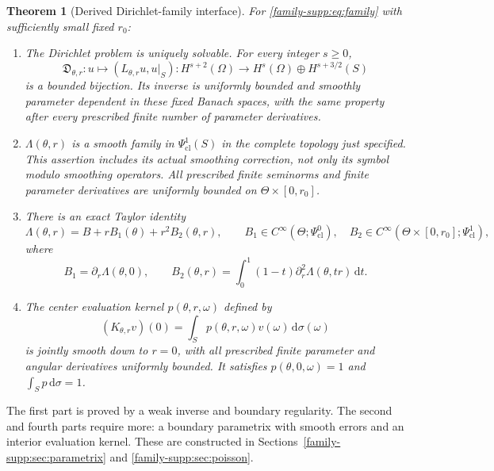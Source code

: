 \documentclass[11pt]{article}
\newtheorem{theorem}{Theorem}[section]
\theoremstyle{definition}
\theoremstyle{remark}
\newcommand{\dd}{\mathrm d}
\numberwithin{equation}{section}
\providecommand{\Ps}{\Psi_{\mathrm{cl}}}
\providecommand{\tht}{\theta}
\begin{document}
\begin{theorem}[Derived Dirichlet-family interface]\label{family-supp:thm:family}
For \eqref{family-supp:eq:family} with sufficiently small fixed $r_0$:
\begin{enumerate}
\item The Dirichlet problem is uniquely solvable. For every integer $s\geq0$,
\begin{equation}\label{family-supp:eq:inverse-space}
 \mathfrak D_{\tht,r}:u\longmapsto(L_{\tht,r}u,u|_S):
 H^{s+2}(\Omega)\longrightarrow H^s(\Omega)\oplus H^{s+3/2}(S)
\end{equation}
is a bounded bijection. Its inverse is uniformly bounded and smoothly
parameter dependent in these fixed Banach spaces, with the same property
after every prescribed finite number of parameter derivatives.
\item $\Lambda(\tht,r)$ is a smooth family in $\Ps^1(S)$ in the complete
topology just specified. This assertion includes its actual smoothing
correction, not only its symbol modulo smoothing operators. All prescribed
finite seminorms and finite parameter derivatives are uniformly bounded
on $\Theta\times[0,r_0]$.
\item There is an exact Taylor identity
\begin{equation}\label{family-supp:eq:Taylor}
 \Lambda(\tht,r)=B+r B_1(\tht)+r^2 B_2(\tht,r),
 \qquad B_1\in C^\infty(\Theta;\Ps^0),\quad
 B_2\in C^\infty(\Theta\times[0,r_0];\Ps^1),
\end{equation}
where
\begin{equation}\label{family-supp:eq:B2}
 B_1=\partial_r\Lambda(\tht,0),\qquad
 B_2(\tht,r)=\int_0^1(1-t)\partial_r^2\Lambda(\tht,tr)\,\dd t.
\end{equation}
\item The center evaluation kernel $p(\tht,r,\omega)$ defined by
\begin{equation}\label{family-supp:eq:pdef}
 (K_{\tht,r}v)(0)=\int_S p(\tht,r,\omega)v(\omega)\,\dd\sigma(\omega)
\end{equation}
is jointly smooth down to $r=0$, with all prescribed finite parameter and
angular derivatives uniformly bounded. It satisfies $p(\tht,0,\omega)=1$
and $\int_Sp\,\dd\sigma=1$.
\end{enumerate}
\end{theorem}

The first part is proved by a weak inverse and boundary regularity. The
second and fourth parts require more: a boundary parametrix with smooth
errors and an interior evaluation kernel. These are constructed in
Sections~\ref{family-supp:sec:parametrix} and \ref{family-supp:sec:poisson}.
\end{document}

